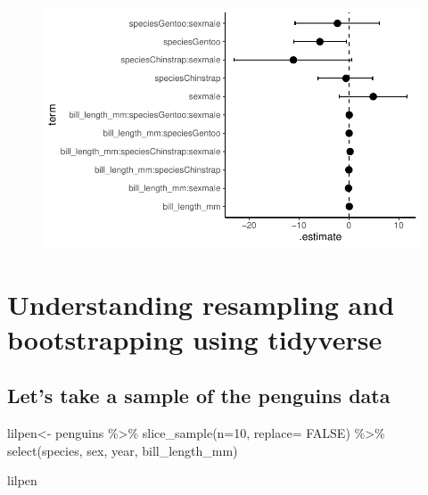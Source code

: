 \documentclass[
  letterpaper,
  DIV=11,
  numbers=noendperiod]{scrartcl}
\newenvironment{Shaded}{\begin{snugshade}}{\end{snugshade}}
\newcommand{\AttributeTok}[1]{\textcolor[rgb]{0.40,0.45,0.13}{#1}}
\newcommand{\ConstantTok}[1]{\textcolor[rgb]{0.56,0.35,0.01}{#1}}
\newcommand{\DecValTok}[1]{\textcolor[rgb]{0.68,0.00,0.00}{#1}}
\newcommand{\FunctionTok}[1]{\textcolor[rgb]{0.28,0.35,0.67}{#1}}
\newcommand{\NormalTok}[1]{\textcolor[rgb]{0.00,0.23,0.31}{#1}}
\newcommand{\OtherTok}[1]{\textcolor[rgb]{0.00,0.23,0.31}{#1}}
\newcommand{\SpecialCharTok}[1]{\textcolor[rgb]{0.37,0.37,0.37}{#1}}
\begin{document}
\begin{figure}[H]

{\centering \includegraphics{CIs_files/figure-pdf/unnamed-chunk-4-1.pdf}

}

\end{figure}

\hypertarget{understanding-resampling-and-bootstrapping-using-tidyverse}{%
\section{\texorpdfstring{\textbf{Understanding resampling and
bootstrapping using
tidyverse}}{Understanding resampling and bootstrapping using tidyverse}}\label{understanding-resampling-and-bootstrapping-using-tidyverse}}

\hypertarget{lets-take-a-sample-of-the-penguins-data}{%
\subsection{Let's take a sample of the penguins
data}\label{lets-take-a-sample-of-the-penguins-data}}

\begin{Shaded}
\begin{Highlighting}[]
\NormalTok{lilpen}\OtherTok{\textless{}{-}}\NormalTok{ penguins }\SpecialCharTok{\%\textgreater{}\%}
  \FunctionTok{slice\_sample}\NormalTok{(}\AttributeTok{n=}\DecValTok{10}\NormalTok{, }\AttributeTok{replace=} \ConstantTok{FALSE}\NormalTok{) }\SpecialCharTok{\%\textgreater{}\%}
  \FunctionTok{select}\NormalTok{(species, sex, year, bill\_length\_mm)}

\NormalTok{lilpen}
\end{Highlighting}
\end{Shaded}
\end{document}
